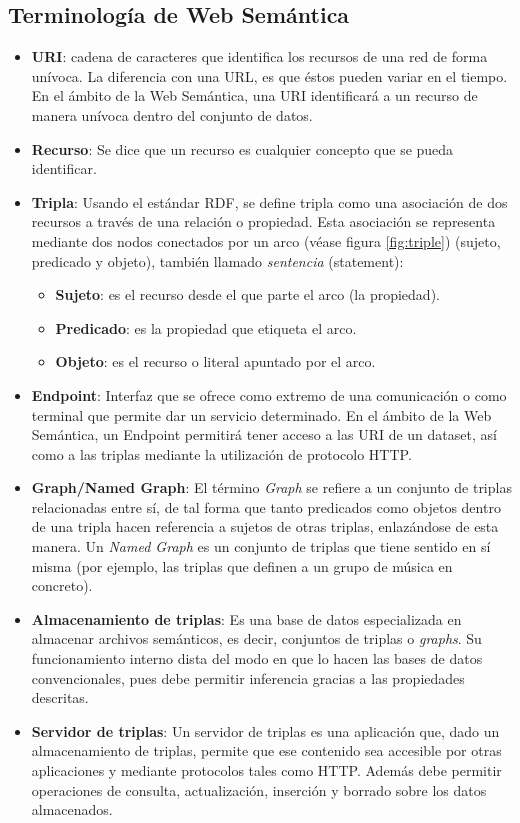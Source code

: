 \subsection{Terminología de Web Semántica}
\label{sbs:terminologia}

\begin{itemize}
\item \textbf{\acf{URI}}: cadena de caracteres
  que identifica los recursos de una red de forma unívoca. La diferencia con una
  \acf{URL}, es que éstos pueden variar en el
  tiempo. En el ámbito de la Web Semántica, una \acs{URI} identificará a un
  recurso de   manera unívoca dentro del conjunto de datos. 
\item \textbf{Recurso}: Se dice que un recurso es cualquier concepto que se pueda
  identificar. 
\item \textbf{Tripla}: Usando el estándar \acf{RDF}, se define tripla como una
  asociación de dos recursos a través de una relación o propiedad. Esta asociación se
  representa mediante dos nodos conectados por un arco (véase figura
  \ref{fig:triple}) (sujeto, predicado y
  objeto), también llamado \textit{sentencia} (statement): 

  \begin{itemize}
  \item \textbf{Sujeto}: es el recurso desde el que parte el arco (la propiedad).
  \item \textbf{Predicado}: es la propiedad que etiqueta el arco. 
  \item \textbf{Objeto}: es el recurso o literal apuntado por el arco. 
  \end{itemize}

\item \textbf{Endpoint}: Interfaz que se ofrece como extremo de una comunicación
  o como terminal que permite dar un servicio determinado. En el ámbito de la
  Web Semántica, un Endpoint permitirá tener acceso a las \acs{URI} de un dataset,
  así como a las triplas mediante la utilización de
  protocolo \acs{HTTP}. 
\item \textbf{Graph/Named Graph}: El término \textit{Graph} se refiere a un
  conjunto de triplas relacionadas entre sí, de tal forma que tanto predicados
  como objetos dentro de una tripla hacen referencia a sujetos de otras triplas,
  enlazándose de esta manera. Un \textit{Named Graph} es un conjunto de triplas
  que tiene sentido en sí misma (por ejemplo, las triplas que definen a un grupo
  de música en concreto). 
\item \textbf{Almacenamiento de triplas}: Es una base de datos especializada en
  almacenar archivos semánticos, es decir, conjuntos de triplas o
  \textit{graphs}. Su funcionamiento interno dista del modo en que lo hacen las
  bases de datos convencionales, pues debe permitir inferencia gracias a las
  propiedades descritas. 
\item \textbf{Servidor de triplas}: Un servidor de triplas es una aplicación
  que, dado un almacenamiento de triplas, permite que ese contenido sea accesible
  por otras aplicaciones y mediante protocolos tales como \acs{HTTP}. Además debe
  permitir operaciones de consulta, actualización, inserción y borrado sobre los
  datos almacenados. 
\end{itemize}
